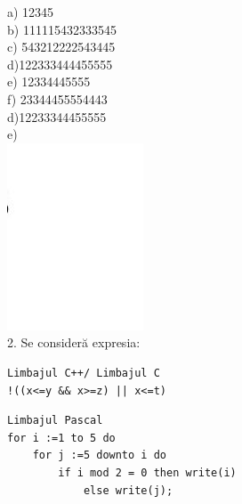 \documentclass[10pt]{article}
\begin{document}
a) 12345\\
b) 111115432333545\\
c) 543212222543445\\
d)122333444455555\\
e) 12334445555\\
f) 23344455554443\\
d)12233344455555\\
e)\\
\includegraphics[max width=\textwidth, center]{2025_04_17_46e04c6acd873ea9558dg-014}\\
2. Se consideră expresia:

\begin{verbatim}
Limbajul C++/ Limbajul C
!((x<=y && x>=z) || x<=t)
\end{verbatim}

\begin{verbatim}
Limbajul Pascal
for i :=1 to 5 do
    for j :=5 downto i do
        if i mod 2 = 0 then write(i)
            else write(j);
\end{verbatim}
\end{document}
